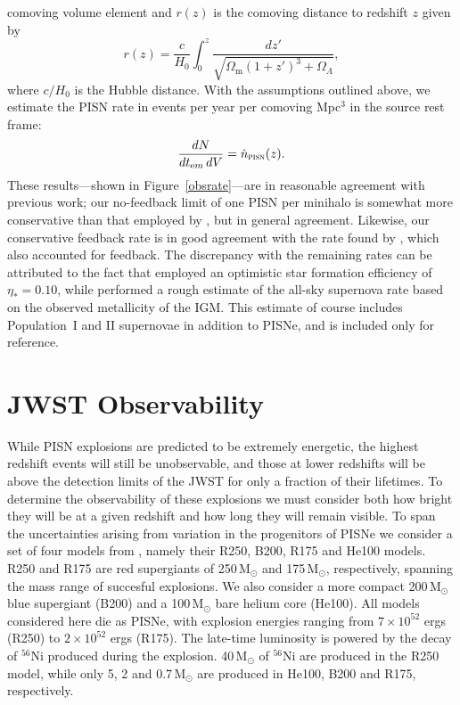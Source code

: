 \documentclass{thesis}
\newcommand{\msun}{\ensuremath{\,\mathrm{M}_{\odot}}\xspace}
\newcommand{\RefFig}[1]{\mbox{Figure~\ref{#1}}}
\begin{document}
comoving volume element and $r(z)$ is the comoving distance to
redshift $z$ given by
\begin{equation}
r(z) = \frac{c}{H_0}\int_0^z \frac{dz'}{\sqrt{\Omega_{\mathrm m} (1+z')^3 +
    \Omega_{\Lambda}}},
\end{equation}
where $c/H_0$ is the Hubble distance.  With the assumptions outlined
above, we estimate the PISN rate in events per year per comoving
Mpc$^3$ in the source rest frame:
\begin{equation}
\frac{dN}{dt_{\mathrm em}\,dV} = \dot{n}_{\textsc{pisn}}(z).
\end{equation}
These results---shown in \RefFig{obsrate}---are in reasonable
agreement with previous work; our no-feedback limit of one PISN per
minihalo is somewhat more conservative than that employed by
\citet{WeinmannLilly2005}, but in general agreement.  Likewise, our
conservative feedback rate is in good agreement with the rate found by
\citet{WiseAbel2005}, which also accounted for feedback.  The
discrepancy with the remaining rates can be attributed to the fact
that \citet{MackeyBrommHernquist2003} employed an optimistic star
formation efficiency of $\eta_*=0.10$, while
\citet{Miralda-EscudeRees1997} performed a rough estimate of the
all-sky supernova rate based on the observed metallicity of the
IGM. This estimate of course includes Population~I and II supernovae in
addition to PISNe, and is included only for reference.


\section{JWST Observability}
\label{JWSTobs}
While PISN explosions are predicted to be extremely energetic, the
highest redshift events will still be unobservable, and those at lower
redshifts will be above the detection limits of the JWST for only a
fraction of their lifetimes. To determine the observability of these
explosions we must consider both how bright they will be at a given
redshift and how long they will remain visible.  To span the
uncertainties arising from variation in the progenitors of PISNe we
consider a set of four models from \citet{KasenWoosleyHeger2011},
namely their R250, B200, R175 and He100 models.  R250 and R175 are red
supergiants of 250\msun and 175\msun, respectively, spanning the mass
range of succesful explosions.  We also consider a more compact
200\msun blue supergiant (B200) and a 100\msun bare helium core
(He100).  All models considered here die as PISNe, with explosion
energies ranging from $7\times10^{52}$ ergs (R250) to $2\times10^{52}$
ergs (R175).  The late-time luminosity is powered by the decay of
$^{56}$Ni produced during the explosion.  40\msun of $^{56}$Ni are
produced in the R250 model, while only 5, 2 and 0.7\msun are produced
in He100, B200 and R175, respectively.
\end{document}
